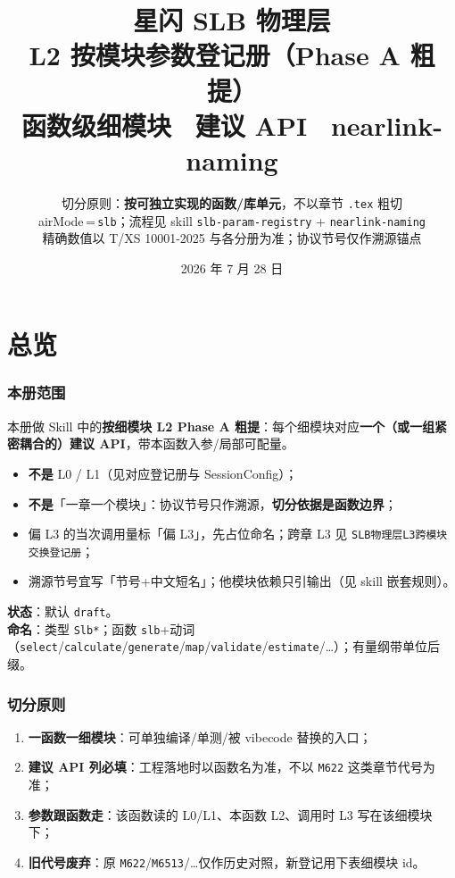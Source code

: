 \documentclass[11pt,a4paper]{ctexart}
\title{%
  \textbf{星闪 SLB 物理层}\\[0.35em]
  \Large L2 按模块参数登记册（Phase A 粗提）\\[0.25em]
  \large 函数级细模块 \textbullet\ 建议 API \textbullet\ nearlink-naming
}
\author{切分原则：\textbf{按可独立实现的函数/库单元}，不以章节 \texttt{.tex} 粗切\\
airMode\,=\,\texttt{slb}；流程见 skill \texttt{slb-param-registry} + \texttt{nearlink-naming}\\[0.2em]
\small 精确数值以 T/XS 10001-2025 与各分册为准；协议节号仅作溯源锚点
}
\date{2026 年 7 月 28 日}
\begin{document}
\maketitle
\tableofcontents
\newpage

\part{总览}

\section{本册范围}

本册做 Skill 中的\textbf{按细模块 L2 Phase A 粗提}：每个细模块对应\textbf{一个（或一组紧密耦合的）建议 API}，带本函数入参/局部可配量。

\begin{itemize}[nosep]
  \item \textbf{不是} L0 / L1（见对应登记册与 SessionConfig）；
  \item \textbf{不是}「一章一个模块」：协议节号只作溯源，\textbf{切分依据是函数边界}；
  \item 偏 L3 的当次调用量标「偏 L3」，先占位命名；跨章 L3 见 \texttt{SLB物理层L3跨模块交换登记册}；
  \item 溯源节号宜写「节号+中文短名」；他模块依赖只引输出（见 skill 嵌套规则）。
\end{itemize}

\textbf{状态}：默认 \texttt{draft}。\\
\textbf{命名}：类型 \texttt{Slb*}；函数 \texttt{slb}+动词（\texttt{select}/\texttt{calculate}/\texttt{generate}/\texttt{map}/\texttt{validate}/\texttt{estimate}/\ldots）；有量纲带单位后缀。

\section{切分原则}

\begin{enumerate}[nosep]
  \item \textbf{一函数一细模块}：可单独编译/单测/被 vibecode 替换的入口；
  \item \textbf{建议 API 列必填}：工程落地时以函数名为准，不以 \texttt{M622} 这类章节代号为准；
  \item \textbf{参数跟函数走}：该函数读的 L0/L1、本函数 L2、调用时 L3 写在该细模块下；
  \item \textbf{旧代号废弃}：原 \texttt{M622}/\texttt{M6513}/\ldots 仅作历史对照，新登记用下表细模块 id。
\end{enumerate}
\end{document}
